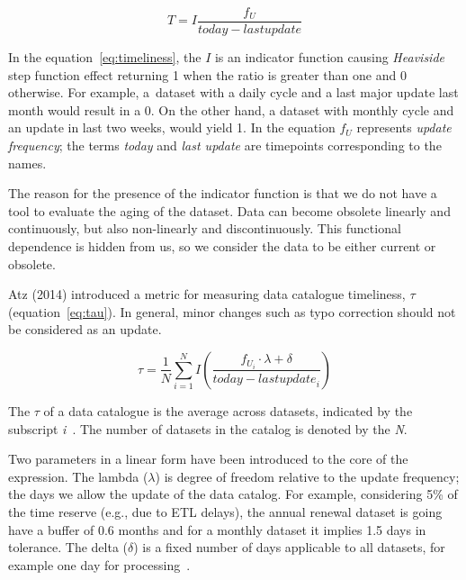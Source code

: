 \begin{equation}\label{eq:timeliness}
    T = I \frac{f_U}{today - last update}
\end{equation}

In the equation~\ref{eq:timeliness}, the \( I \) is an indicator function causing \textit{Heaviside} step function effect returning 1 when the ratio is greater than one and 0 otherwise.
For example, a~dataset with a daily cycle and a last major update last month would result in a 0.
On the other hand, a dataset with monthly cycle and an update in last two weeks, would yield 1.
In the equation \( f_U \) represents \textit{update frequency}; the terms \textit{today} and \textit{last update} are timepoints corresponding to the names.

The reason for the presence of the indicator function is that we do not have a tool to evaluate the aging of the dataset.
Data can become obsolete linearly and continuously, but also non-linearly and discontinuously.
This functional dependence is hidden from us, so we consider the data to be either current or obsolete.


Atz (2014) introduced a metric for measuring data catalogue timeliness, \( \tau \) (equation~\ref{eq:tau}).
In general, minor changes such as typo correction should not be considered as an update.

\begin{equation}\label{eq:tau}
    \tau = \frac{1}{N} \sum_{i = 1}^N I \left( \frac{f_{U_i} \cdot \lambda + \delta}{today - {last update}_i} \right)
\end{equation}

The \( \tau \) of a data catalogue is the average across datasets, indicated by the subscript \textit{i}~\cite{atz2014tau}.
The number of datasets in the catalog is denoted by the \textit{N}.

Two parameters in a linear form have been introduced to the core of the expression.
The lambda (\( \lambda \)) is degree of freedom relative to the update frequency; the days we allow the update of the data catalog.
For example, considering 5\% of the time reserve (e.g., due to ETL delays), the annual renewal dataset is going have a buffer of 0.6 months and for a monthly dataset it implies 1.5 days in tolerance.
The delta (\( \delta \)) is a fixed number of days applicable to all datasets, for example one day for processing~\cite{atz2014tau}.

